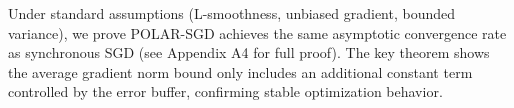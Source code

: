 


Under standard assumptions (L-smoothness, unbiased gradient, bounded variance), we prove POLAR-SGD achieves the same asymptotic convergence rate as synchronous SGD (see Appendix A4 for full proof). The key theorem shows the average gradient norm bound only includes an additional constant term controlled by the error buffer, confirming stable optimization behavior.